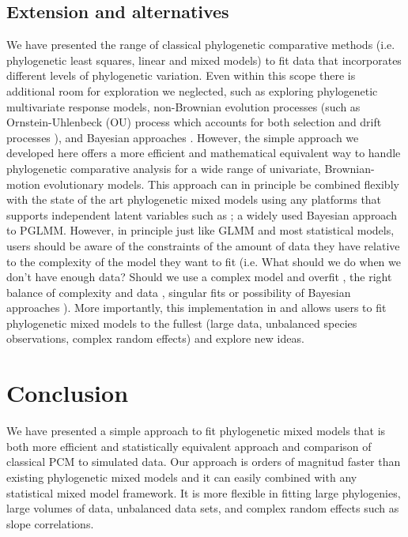 \documentclass[12pt]{article}
\begin{document}
\subsection*{Extension and alternatives}

We have presented the range of classical phylogenetic comparative methods (i.e. phylogenetic least squares, linear and mixed models) to fit data that incorporates different levels of phylogenetic variation.
Even within this scope there is additional room for exploration we neglected, such as exploring phylogenetic multivariate response models, non-Brownian evolution processes (such as Ornstein-Uhlenbeck (OU) process which accounts for both selection and drift processes \citep{butler2004phylogenetic}), and Bayesian approaches \citep{hadfield2010general}.
However, the simple approach we developed here offers a more efficient and mathematical equivalent way to handle phylogenetic comparative analysis for a wide range of univariate, Brownian-motion evolutionary models. 
This approach can in principle be combined flexibly with the state of the art phylogenetic mixed models using any platforms that supports independent latent variables such as  \citep{hadfield2010mcmc}; a widely used Bayesian approach to PGLMM.
However, in principle just like GLMM and most statistical models, users should be aware of the constraints of the amount of data they have relative to the complexity of the model they want to fit (i.e. What should we do when we don't have enough data? Should we use a complex model and overfit \citep{barr2013random}, the right balance of complexity and data \citep{baayen2008mixed}, singular fits or possibility of Bayesian approaches \citep{hadfield2010mcmc}).
More importantly, this implementation in  and  allows users to fit phylogenetic mixed models to the fullest (large data, unbalanced species observations, complex random effects) and explore new ideas.


\section*{Conclusion}

We have presented a simple approach to fit phylogenetic mixed models that is both more efficient and statistically equivalent approach and comparison of classical PCM to simulated data. 
Our approach is orders of magnitud faster than existing phylogenetic mixed models and it can easily combined with any statistical mixed model framework. 
It is more flexible in fitting large phylogenies, large volumes of data, unbalanced data sets, and complex random effects such as slope correlations.
\end{document}
